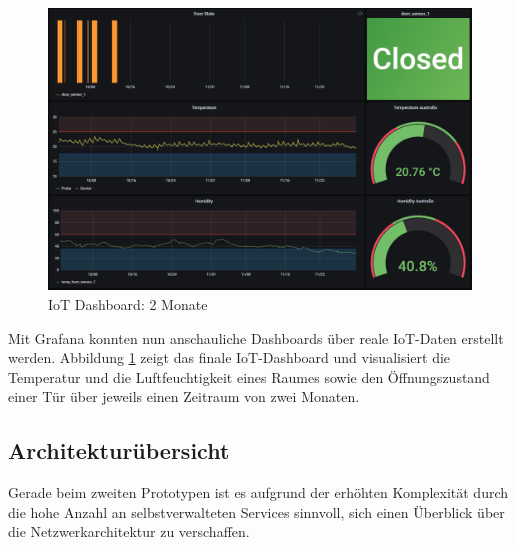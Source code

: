 \begin{figure}[H]
  \begin{center}
    \includegraphics[width=1\textwidth]{./images/dashboard-longterm.png}  
    \end{center}
  \vspace{-5pt}
  \caption[IoT Dashboard: 2 Monate]{IoT Dashboard: 2 Monate}
  \label{fig:dashboard-longterm}
  \vspace{-5pt}
\end{figure}

Mit Grafana konnten nun anschauliche Dashboards über reale IoT-Daten erstellt werden. Abbildung \ref{fig:dashboard-longterm} zeigt das finale IoT-Dashboard und visualisiert die Temperatur und die Luftfeuchtigkeit eines Raumes sowie den Öffnungszustand einer Tür über jeweils einen Zeitraum von zwei Monaten.


\subsection{Architekturübersicht}
\label{sec:Prot:architektur2}

Gerade beim zweiten Prototypen ist es aufgrund der erhöhten Komplexität durch die hohe Anzahl an selbstverwalteten Services sinnvoll, sich einen Überblick über die Netzwerkarchitektur zu verschaffen. 

